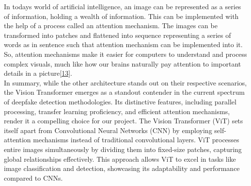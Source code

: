 \noindent In todays world of artificial intelligence, an image can be represented as a series of information, holding a wealth of information. This can be implemented with the help of a process called an attention mechanism. The images can be transformed into patches and flattened into sequence representing a series of words as in sentence such that attention mechanism can be implemented into it. So, attention mechanisms make it easier for computers to understand and process complex visuals, much like how our brains naturally pay attention to important details in a picture\hyperref[ref13]{[13]}.\\

\noindent In summary, while the other architecture stands out on their respective scenarios, the Vision Transformer emerges as a standout contender in the current spectrum of deepfake detection methodologies. Its distinctive features, including parallel processing, transfer learning proficiency, and efficient attention mechanisms, render it a compelling choice for our project. The Vision Transformer (ViT) sets itself apart from Convolutional Neural Networks (CNN) by employing self-attention mechanisms instead of traditional convolutional layers. ViT processes entire images simultaneously by dividing them into fixed-size patches, capturing global relationships effectively. This approach allows ViT to excel in tasks like image classification and detection, showcasing its adaptability and performance compared to CNNs.
